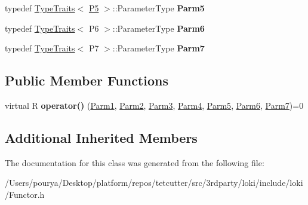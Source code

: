 \begin{DoxyCompactItemize}
\item 
\hypertarget{classLoki_1_1FunctorImpl_3_01R_00_01Seq_3_01P1_00_01P2_00_01P3_00_01P4_00_01P5_00_01P6_00_01P7_01_4_00_01ThreadingModel_01_4_a4f0ec1bfd6127e86c6387d203e8ccec0}{}typedef \hyperlink{classLoki_1_1TypeTraits}{Type\+Traits}$<$ \hyperlink{structP5}{P5} $>$\+::Parameter\+Type {\bfseries Parm5}\label{classLoki_1_1FunctorImpl_3_01R_00_01Seq_3_01P1_00_01P2_00_01P3_00_01P4_00_01P5_00_01P6_00_01P7_01_4_00_01ThreadingModel_01_4_a4f0ec1bfd6127e86c6387d203e8ccec0}

\item 
\hypertarget{classLoki_1_1FunctorImpl_3_01R_00_01Seq_3_01P1_00_01P2_00_01P3_00_01P4_00_01P5_00_01P6_00_01P7_01_4_00_01ThreadingModel_01_4_a1f9292a861f0567a3b54483e09b14a98}{}typedef \hyperlink{classLoki_1_1TypeTraits}{Type\+Traits}$<$ P6 $>$\+::Parameter\+Type {\bfseries Parm6}\label{classLoki_1_1FunctorImpl_3_01R_00_01Seq_3_01P1_00_01P2_00_01P3_00_01P4_00_01P5_00_01P6_00_01P7_01_4_00_01ThreadingModel_01_4_a1f9292a861f0567a3b54483e09b14a98}

\item 
\hypertarget{classLoki_1_1FunctorImpl_3_01R_00_01Seq_3_01P1_00_01P2_00_01P3_00_01P4_00_01P5_00_01P6_00_01P7_01_4_00_01ThreadingModel_01_4_ac97c95399a77006232a72dbd7a82d6c9}{}typedef \hyperlink{classLoki_1_1TypeTraits}{Type\+Traits}$<$ P7 $>$\+::Parameter\+Type {\bfseries Parm7}\label{classLoki_1_1FunctorImpl_3_01R_00_01Seq_3_01P1_00_01P2_00_01P3_00_01P4_00_01P5_00_01P6_00_01P7_01_4_00_01ThreadingModel_01_4_ac97c95399a77006232a72dbd7a82d6c9}

\end{DoxyCompactItemize}
\subsection*{Public Member Functions}
\begin{DoxyCompactItemize}
\item 
\hypertarget{classLoki_1_1FunctorImpl_3_01R_00_01Seq_3_01P1_00_01P2_00_01P3_00_01P4_00_01P5_00_01P6_00_01P7_01_4_00_01ThreadingModel_01_4_a9df39c469af99b39a761a3ce41407a22}{}virtual R {\bfseries operator()} (\hyperlink{classLoki_1_1EmptyType}{Parm1}, \hyperlink{classLoki_1_1EmptyType}{Parm2}, \hyperlink{classLoki_1_1EmptyType}{Parm3}, \hyperlink{classLoki_1_1EmptyType}{Parm4}, \hyperlink{classLoki_1_1EmptyType}{Parm5}, \hyperlink{classLoki_1_1EmptyType}{Parm6}, \hyperlink{classLoki_1_1EmptyType}{Parm7})=0\label{classLoki_1_1FunctorImpl_3_01R_00_01Seq_3_01P1_00_01P2_00_01P3_00_01P4_00_01P5_00_01P6_00_01P7_01_4_00_01ThreadingModel_01_4_a9df39c469af99b39a761a3ce41407a22}

\end{DoxyCompactItemize}
\subsection*{Additional Inherited Members}


The documentation for this class was generated from the following file\+:\begin{DoxyCompactItemize}
\item 
/\+Users/pourya/\+Desktop/platform/repos/tetcutter/src/3rdparty/loki/include/loki/Functor.\+h\end{DoxyCompactItemize}
